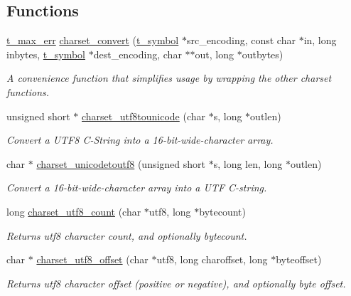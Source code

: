 \subsection*{Functions}
\begin{DoxyCompactItemize}
\item 
\hyperlink{group__datatypes_ga73edaae82b318855cc09fac994918165}{t\_\-max\_\-err} \hyperlink{group__unicode_ga9ec526f1940a33256f61e5d5fdf8283c}{charset\_\-convert} (\hyperlink{structt__symbol}{t\_\-symbol} $\ast$src\_\-encoding, const char $\ast$in, long inbytes, \hyperlink{structt__symbol}{t\_\-symbol} $\ast$dest\_\-encoding, char $\ast$$\ast$out, long $\ast$outbytes)
\begin{DoxyCompactList}\small\item\em A convenience function that simplifies usage by wrapping the other charset functions. \item\end{DoxyCompactList}\item 
unsigned short $\ast$ \hyperlink{group__unicode_ga3f69447412c37263c41fcb1d3a69f3ec}{charset\_\-utf8tounicode} (char $\ast$s, long $\ast$outlen)
\begin{DoxyCompactList}\small\item\em Convert a UTF8 C-\/String into a 16-\/bit-\/wide-\/character array. \item\end{DoxyCompactList}\item 
char $\ast$ \hyperlink{group__unicode_gad14b26e9b1d77ef47170076d0d9e099c}{charset\_\-unicodetoutf8} (unsigned short $\ast$s, long len, long $\ast$outlen)
\begin{DoxyCompactList}\small\item\em Convert a 16-\/bit-\/wide-\/character array into a UTF C-\/string. \item\end{DoxyCompactList}\item 
long \hyperlink{group__unicode_ga94f22fadc5fbc03f9153099ecbc0470e}{charset\_\-utf8\_\-count} (char $\ast$utf8, long $\ast$bytecount)
\begin{DoxyCompactList}\small\item\em Returns utf8 character count, and optionally bytecount. \item\end{DoxyCompactList}\item 
char $\ast$ \hyperlink{group__unicode_ga2c03ff86b04bcf33c0ba0915a9e1c1da}{charset\_\-utf8\_\-offset} (char $\ast$utf8, long charoffset, long $\ast$byteoffset)
\begin{DoxyCompactList}\small\item\em Returns utf8 character offset (positive or negative), and optionally byte offset. \item\end{DoxyCompactList}\end{DoxyCompactItemize}


